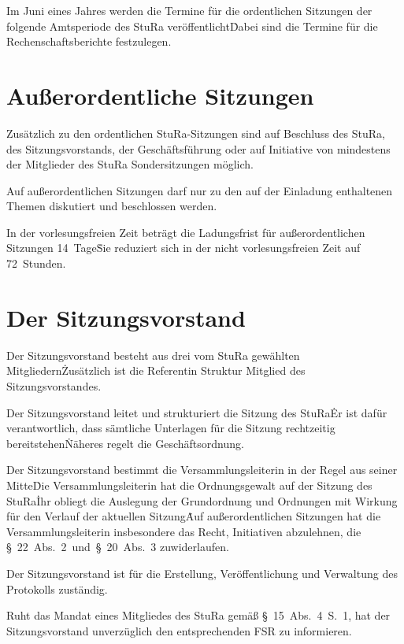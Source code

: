 \begin{multicols}{2}
\Abs \Satz Im Juni eines Jahres werden die Termine für die ordentlichen Sitzungen der folgende Amtsperiode des StuRa veröffentlicht\. Dabei sind die Termine für die Rechenschaftsberichte festzulegen.



\section{Außerordentliche Sitzungen}

\Abs \Satz Zusätzlich zu den ordentlichen StuRa-Sitzungen sind auf Beschluss des StuRa, des Sitzungsvorstands, der Geschäftsführung oder auf Initiative von mindestens  der Mitglieder des StuRa Sondersitzungen möglich.

\Abs \Satz Auf außerordentlichen Sitzungen darf nur zu den auf der Einladung enthaltenen Themen diskutiert und beschlossen werden.

\Abs \Satz In der vorlesungsfreien Zeit beträgt die Ladungsfrist für außerordentlichen Sitzungen 14~Tage\. Sie reduziert sich in der nicht vorlesungsfreien Zeit auf 72~Stunden.



\section{Der Sitzungsvorstand}

\Abs \Satz Der Sitzungsvorstand besteht aus drei vom StuRa gewählten Mitgliedern\. Zusätzlich ist die Referentin Struktur Mitglied des Sitzungsvorstandes.

\Abs \Satz Der Sitzungsvorstand leitet und strukturiert die Sitzung des StuRa\. Er ist dafür verantwortlich, dass sämtliche Unterlagen für die Sitzung rechtzeitig bereitstehen\. Näheres regelt die Geschäftsordnung.

\Abs \Satz Der Sitzungsvorstand bestimmt die Versammlungsleiterin in der Regel aus seiner Mitte\. Die Versammlungsleiterin hat die Ordnungsgewalt auf der Sitzung des StuRa\. Ihr obliegt die Auslegung der Grundordnung und Ordnungen mit Wirkung für den Verlauf der aktuellen Sitzung\. Auf außerordentlichen Sitzungen hat die Versammlungsleiterin insbesondere das Recht, Initiativen abzulehnen, die §~22~Abs.~2~und~§~20~Abs.~3 zuwiderlaufen.

\Abs \Satz Der Sitzungsvorstand ist für die Erstellung, Veröffentlichung und Verwaltung des Protokolls zuständig.

\Abs \Satz Ruht das Mandat eines Mitgliedes des StuRa gemäß §~15~Abs.~4~S.~1, hat der Sitzungsvorstand unverzüglich den entsprechenden FSR zu informieren.



\end{multicols}
